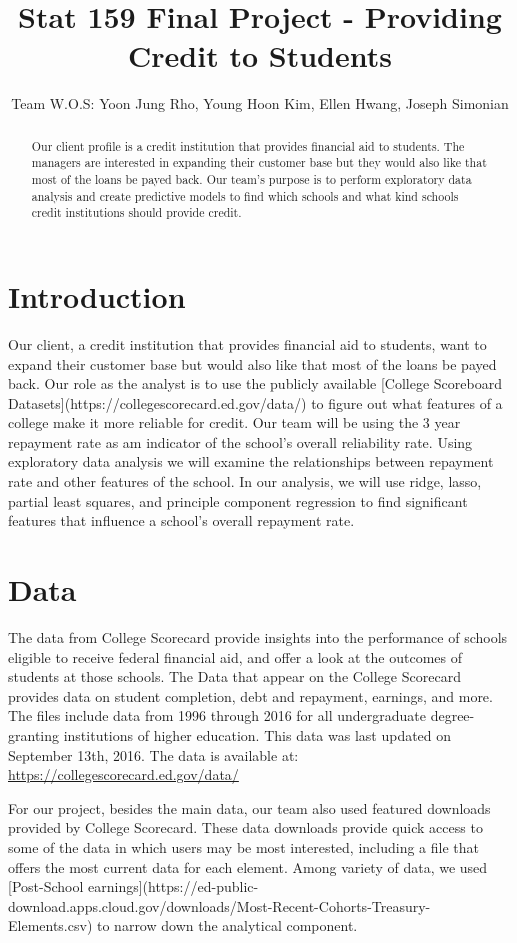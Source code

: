 \documentclass[a4paper]{article}\usepackage[]{graphicx}\usepackage[]{color}
\title{Stat 159 Final Project - Providing Credit to Students}
\author{Team W.O.S: Yoon Jung Rho, Young Hoon Kim, Ellen Hwang, Joseph Simonian}
\begin{document}
\maketitle

\begin{abstract}
Our client profile is a credit institution that provides financial aid to students. The managers are interested in expanding their customer base but they would also like that most of the loans be payed back. Our team's purpose is to perform exploratory data analysis and create predictive models to find which schools and what kind schools credit institutions should provide credit.
\end{abstract}
\section{Introduction}

Our client, a credit institution that provides financial aid to students, want to expand their customer base but would also like that most of the loans be payed back. Our role as the analyst is to use the publicly available [College Scoreboard Datasets](https://collegescorecard.ed.gov/data/) to figure out what features of a college make it more reliable for credit. Our team will be using the 3 year repayment rate as am indicator of the school's overall reliability rate. Using exploratory data analysis we will examine the relationships between repayment rate and other features of the school. In our analysis, we will use ridge, lasso, partial least squares, and principle component regression to find significant features that influence a school's overall repayment rate. 
\section{Data}

The data from College Scorecard provide insights into the performance of schools eligible to receive federal financial aid, and offer a look at the outcomes of students at those schools. The Data that appear on the College Scorecard provides data on student completion, debt and repayment, earnings, and more. The files include data from 1996 through 2016 for all undergraduate degree-granting institutions of higher education. This data was last updated on September 13th, 2016. The data is available at: \url{https://collegescorecard.ed.gov/data/}

For our project, besides the main data, our team also used featured downloads provided by College Scorecard. These data downloads provide quick access to some of the data in which users may be most interested, including a file that offers the most current data for each element. Among variety of data, we used [Post-School earnings](https://ed-public-download.apps.cloud.gov/downloads/Most-Recent-Cohorts-Treasury-Elements.csv) to narrow down the analytical component.
\end{document}
